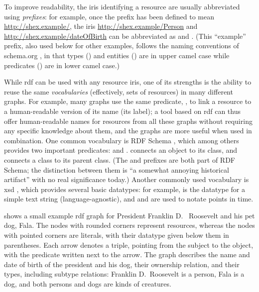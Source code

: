 To improve readability, the \glspl{iri} identifying a \gls{resource} are usually abbreviated using \emph{prefixes}:
for example, once the prefix  has been defined to mean \url{http://shex.example/},
the \glspl{iri} \url{http://shex.example/Person} and \url{http://shex.example/dateOfBirth}
can be abbreviated as  and .
(This “example” prefix, also used below for other examples,
follows the naming conventions of schema.org \cite{schema.org-old-extension},
in that types () and entities () are in upper camel case
while predicates () are in lower camel case.)

While \gls{rdf} can be used with any \gls{resource} \glspl{iri},
one of its strengths is the ability to reuse the same \emph{vocabularies}
(effectively, sets of \glspl{resource})
in many different graphs.
For example, many graphs use the same \gls{predicate}, ,
to link a \gls{resource} to a human-readable version of its name (its label);
a tool based on \gls{rdf} can thus offer human-readable names for \glspl{resource} from all these graphs
without requiring any specific knowledge about them,
and the graphs are more useful when used in combination.
One common vocabulary is RDF Schema \cite{Guha:14:RS}, %
which among others provides two important predicates:
 and .
 connects an object to its class,
and  connects a class to its parent class.
(The  and  prefixes are both part of RDF Schema;
the distinction between them is “a somewhat annoying historical artifact” \cite{Schreiber:14:RP}
with no real significance today.)
Another commonly used vocabulary is \gls{xsd} \cite{Malhotra:04:XSP},
which provides several basic datatypes:
for example,  is the datatype for a simple text string (language-agnostic),
and  and  are used to notate points in time.

 shows a small example \gls{rdf} graph
for President Franklin D.~ Roosevelt and his pet dog, Fala.
The nodes with rounded corners represent \glspl{resource},
whereas the nodes with pointed corners are literals,
with their datatype given below them in parentheses.
Each arrow denotes a \gls{triple}, pointing from the \gls{subject} to the \gls{object},
with the \gls{predicate} written next to the arrow.
The graph describes the name and date of birth of the president and his dog,
their ownership relation,
and their types, including subtype relations:
Franklin D.~Roosevelt is a person, Fala is a dog,
and both persons and dogs are kinds of creatures.

